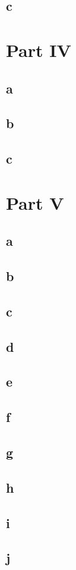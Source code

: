 \documentclass[10pt,letterpaper]{article}
\begin{document}
\subsection*{c}


\section*{Part IV}
\subsection*{a}

\subsection*{b}

\subsection*{c}


\section*{Part V}
\subsection*{a}

\subsection*{b}

\subsection*{c}

\subsection*{d}

\subsection*{e}

\subsection*{f}

\subsection*{g}

\subsection*{h}

\subsection*{i}

\subsection*{j}
\end{document}

